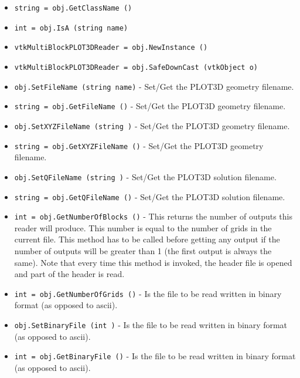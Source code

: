 \begin{itemize}
\item  \verb|string = obj.GetClassName ()|

\item  \verb|int = obj.IsA (string name)|

\item  \verb|vtkMultiBlockPLOT3DReader = obj.NewInstance ()|

\item  \verb|vtkMultiBlockPLOT3DReader = obj.SafeDownCast (vtkObject o)|

\item  \verb|obj.SetFileName (string name)| -  Set/Get the PLOT3D geometry filename.

\item  \verb|string = obj.GetFileName ()| -  Set/Get the PLOT3D geometry filename.

\item  \verb|obj.SetXYZFileName (string )| -  Set/Get the PLOT3D geometry filename.

\item  \verb|string = obj.GetXYZFileName ()| -  Set/Get the PLOT3D geometry filename.

\item  \verb|obj.SetQFileName (string )| -  Set/Get the PLOT3D solution filename.

\item  \verb|string = obj.GetQFileName ()| -  Set/Get the PLOT3D solution filename.

\item  \verb|int = obj.GetNumberOfBlocks ()| -  This returns the number of outputs this reader will produce.
 This number is equal to the number of grids in the current 
 file. This method has to be called before getting any output
 if the number of outputs will be greater than 1 (the first
 output is always the same). Note that every time this method
 is invoked, the header file is opened and part of the header 
 is read.

\item  \verb|int = obj.GetNumberOfGrids ()| -  Is the file to be read written in binary format (as opposed
 to ascii).

\item  \verb|obj.SetBinaryFile (int )| -  Is the file to be read written in binary format (as opposed
 to ascii).

\item  \verb|int = obj.GetBinaryFile ()| -  Is the file to be read written in binary format (as opposed
 to ascii).


\end{itemize}
